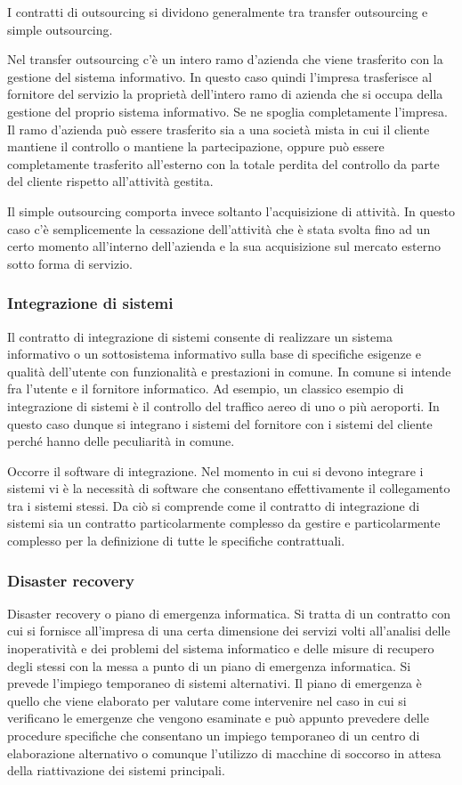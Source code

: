 I contratti di outsourcing si dividono generalmente tra transfer outsourcing e simple outsourcing. 

Nel transfer outsourcing c'è un intero ramo d'azienda che viene trasferito con la gestione del sistema informativo. In questo caso quindi l'impresa trasferisce al fornitore del servizio la proprietà dell'intero ramo di azienda che si occupa della gestione del proprio sistema informativo. Se ne spoglia completamente l'impresa. Il ramo d'azienda può essere trasferito sia a una società mista in cui il cliente mantiene il controllo o mantiene la partecipazione, oppure può essere completamente trasferito all'esterno con la totale perdita del controllo da parte del cliente rispetto all'attività gestita. 

Il simple outsourcing comporta invece soltanto l'acquisizione di attività. In questo caso c'è semplicemente la cessazione dell'attività che è stata svolta fino ad un certo momento all'interno dell'azienda e la sua acquisizione sul mercato esterno sotto forma di servizio. 

\subsubsection{Integrazione di sistemi} 

Il contratto di integrazione di sistemi consente di realizzare un sistema informativo o un sottosistema informativo sulla base di specifiche esigenze e qualità dell'utente con funzionalità e prestazioni in comune. In comune si intende fra l'utente e il fornitore informatico. Ad esempio, un classico esempio di integrazione di sistemi è il controllo del traffico aereo di uno o più aeroporti. In questo caso dunque si integrano i sistemi del fornitore con i sistemi del cliente perché hanno delle peculiarità in comune. 

Occorre il software di integrazione. Nel momento in cui si devono integrare i sistemi vi è la necessità di software che consentano effettivamente il collegamento tra i sistemi stessi. Da ciò si comprende come il contratto di integrazione di sistemi sia un contratto particolarmente complesso da gestire e particolarmente complesso per la definizione di tutte le specifiche contrattuali. 

\subsubsection{Disaster recovery} 

Disaster recovery o piano di emergenza informatica. Si tratta di un contratto con cui si fornisce all'impresa di una certa dimensione dei servizi volti all'analisi delle inoperatività e dei problemi del sistema informatico e delle misure di recupero degli stessi con la messa a punto di un piano di emergenza informatica. Si prevede l'impiego temporaneo di sistemi alternativi. Il piano di emergenza è quello che viene elaborato per valutare come intervenire nel caso in cui si verificano le emergenze che vengono esaminate e può appunto prevedere delle procedure specifiche che consentano un impiego temporaneo di un centro di elaborazione alternativo o comunque l'utilizzo di macchine di soccorso in attesa della riattivazione dei sistemi principali. 

